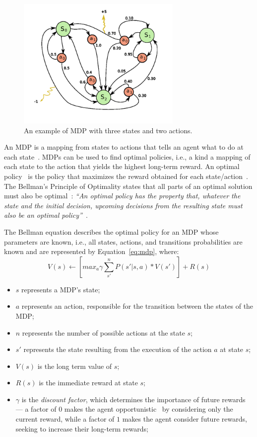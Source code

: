 \begin{figure}
\centering
\includegraphics[width=300px]{images/mdp}
\caption{An example of MDP with three states and two actions.}
\label{fig:mdp}
\end{figure}

An MDP is a mapping from states to actions that tells an agent what to do at each state~\cite{bellman1957dynamic,dreyfus2002richard}.
MDPs can be used to find optimal policies, i.e., a kind a mapping of each state to the action that yields the highest long-term reward.
An optimal policy~\cite{morin1982monotonicity, mitten1964composition} is the policy that 
maximizes the reward obtained for each state/action~\cite{guelpeli2003utilizaccao}.
The Bellman's Principle of Optimality states that all parts of an optimal solution must also be optimal~\cite{morin1982monotonicity}:
\textit{
``An optimal policy has the property that, whatever the state and the initial decision,
upcoming decisions from the resulting state must also be an optimal policy''}~\cite[p. 83]{bellman1957dynamic}.

The Bellman equation describes the optimal policy for an MDP whose parameters are known, i.e., all states, actions, and transitions probabilities are known and are represented by Equation~\ref{eq:mdp}, where:
\begin{equation} \label{eq:mdp}
	V(s) \leftarrow \left[max_a \gamma \sum_{s'}^n P(s'|s,a) * V(s')\right] + R(s)
\end{equation}

\begin{itemize}
\item $s$ represents a MDP's state;
\item $a$ represents an action, responsible for the transition between the states of the MDP;
\item $n$ represents the number of possible actions at the state $s$;
\item $s'$ represents the state resulting from the execution of the action $a$ at state $s$;
\item $V(s)$ is the long term value of $s$;
\item $R(s)$ is the immediate reward at state $s$;
\item $\gamma$ is the \textit{discount factor}, which determines the importance of future rewards --- a factor of $0$ makes the agent opportunistic~\cite{schweighofer2003meta} by considering only the current reward, while a factor of $1$ makes the agent consider future rewards, seeking to increase their long-term rewards;
\end{itemize}

